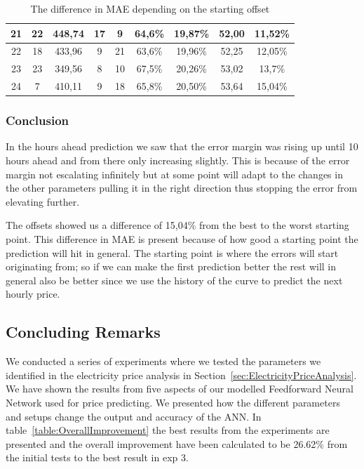 \begin{table}[H]
{\begin{tabular}{|c|c|c|c|c|c|c|c|c|}
	21 & 22  & 448,74 & 17 & 9  & 64,6\% & 19,87\% & 52,00 & 11,52\% \\ \hline
	22 & 18  & 433,96 & 9  & 21 & 63,6\% & 19,96\% & 52,25 & 12,05\% \\ \hline
	23 & 23  & 349,56 & 8  & 10 & 67,5\% & 20,26\% & 53,02 & 13,7\% \\ \hline
	24 & 7   & 410,11 & 9  & 18 & 65,8\% & 20,50\% & 53,64 & 15,04\% \\ \hline
	\end{tabular}
}
\caption{The difference in MAE depending on the starting offset} %
\label{table:Offsets} %
\end{table}

\subsubsection{Conclusion}
In the hours ahead prediction we saw that the error margin was rising up until 10 hours ahead and from there only increasing slightly. This is because of the error margin not escalating infinitely but at some point will adapt to the changes in the other parameters pulling it in the right direction thus stopping the error from elevating further.

The offsets showed us a difference of 15,04\% from the best to the worst starting point. This difference in MAE is present because of how good a starting point the prediction will hit in general. The starting point is where the errors will start originating from; so if we can make the first prediction better the rest will in general also be better since we use the history of the curve to predict the next hourly price.

\newpage
\subsection{Concluding Remarks}
We conducted a series of experiments where we tested the parameters we identified in the electricity price analysis in Section~\ref{sec:ElectricityPriceAnalysis}. We have shown the results from five aspects of our modelled Feedforward Neural Network used for price predicting. We presented how the different parameters and setups change the output and accuracy of the ANN. In table~\ref{table:OverallImprovement} the best results from the experiments are presented and the overall improvement have been calculated to be 26.62\% from the initial tests to the best result in exp 3.

